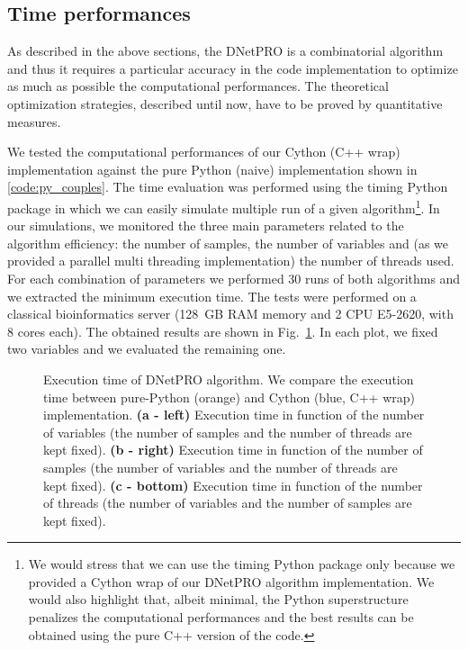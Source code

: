 \documentclass{standalone}
\begin{document}
\subsection[Time performances]{Time performances}\label{implementation:timing}

As described in the above sections, the DNetPRO is a combinatorial algorithm and thus it requires a particular accuracy in the code implementation to optimize as much as possible the computational performances.
The theoretical optimization strategies, described until now, have to be proved by quantitative measures.

We tested the computational performances of our \textsf{Cython} (\textsf{C++} wrap) implementation against the pure \textsf{Python} (naive) implementation shown in \ref{code:py_couples}.
The time evaluation was performed using the \textsf{timing} \textsf{Python} package in which we can easily simulate multiple run of a given algorithm\footnote{
  We would stress that we can use the \textsf{timing} \textsf{Python} package only because we provided a Cython wrap of our DNetPRO algorithm implementation.
  We would also highlight that, albeit minimal, the \textsf{Python} superstructure penalizes the computational performances and the best results can be obtained using the pure \textsf{C++} version of the code.
}.
In our simulations, we monitored the three main parameters related to the algorithm efficiency: the number of samples, the number of variables and (as we provided a parallel multi threading implementation) the number of threads used.
For each combination of parameters we performed 30 runs of both algorithms and we extracted the minimum execution time.
The tests were performed on a classical bioinformatics server (128~GB RAM memory and 2 CPU E5-2620, with 8 cores each).
The obtained results are shown in Fig.~\ref{fig:dnetpro_timing}.
In each plot, we fixed two variables and we evaluated the remaining one.

\begin{figure}[htbp]
\hspace{-1.0cm}
\def\svgwidth{0.45\textwidth}

\qquad
\hspace{1.0cm}
\def\svgwidth{0.45\textwidth}

\qquad\qquad
\centering
\def\svgwidth{0.7\textwidth}

\caption{Execution time of DNetPRO algorithm.
We compare the execution time between pure-\textsf{Python} (orange) and Cython (blue, \textsf{C++} wrap) implementation.
\textbf{(a - left)} Execution time in function of the number of variables (the number of samples and the number of threads are kept fixed).
\textbf{(b - right)} Execution time in function of the number of samples (the number of variables and the number of threads are kept fixed).
\textbf{(c - bottom)} Execution time in function of the number of threads (the number of variables and the number of samples are kept fixed).
}
\label{fig:dnetpro_timing}
\end{figure}
\end{document}
